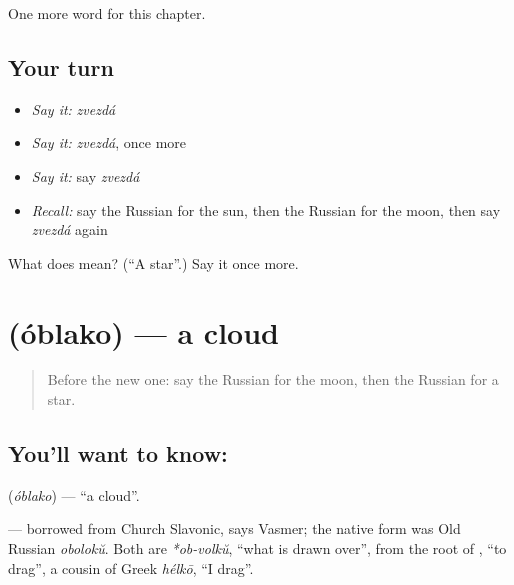 \begin{grammarlens}[title={What you've built}]
One more word for this chapter.
\end{grammarlens}

\subsection*{Your turn}
\begin{itemize}
\raggedright
  \item \emph{Say it:} \emph{zvezdá}
  \item \emph{Say it:} \emph{zvezdá}, once more
  \item \emph{Say it:} say \emph{zvezdá}
  \item \emph{Recall:} say the Russian for the sun, then the Russian for the moon, then say \emph{zvezdá} again
\end{itemize}

\begin{tcolorbox}[breakable,colback=teal!4,colframe=teal!35!black,title={Before you move on}]
What does  mean? (\textquotedblleft{}A star\textquotedblright{}.) Say it once more.
\end{tcolorbox}
\section[\texorpdfstring{\ru{облако} (óblako)}{облако (óblako)}]{ (óblako) — a cloud}

\label{lesson:RU-C58-cloud}



\begin{quote}
Before the new one: say the Russian for the moon, then the Russian for a star.
\end{quote}

\subsection*{You'll want to know: }
\textbf{} (\emph{óblako}) — \textquotedblleft{}a cloud\textquotedblright{}.

\begin{cousinweb}
\textbf{} — borrowed from Church Slavonic, says Vasmer; the native form was Old Russian \emph{obolokŭ}. Both are \emph{*ob-volkŭ}, \textquotedblleft{}what is drawn over\textquotedblright{}, from the root of \emph{}, \textquotedblleft{}to drag\textquotedblright{}, a cousin of Greek \emph{hélkō}, \textquotedblleft{}I drag\textquotedblright{}.
\end{cousinweb}

